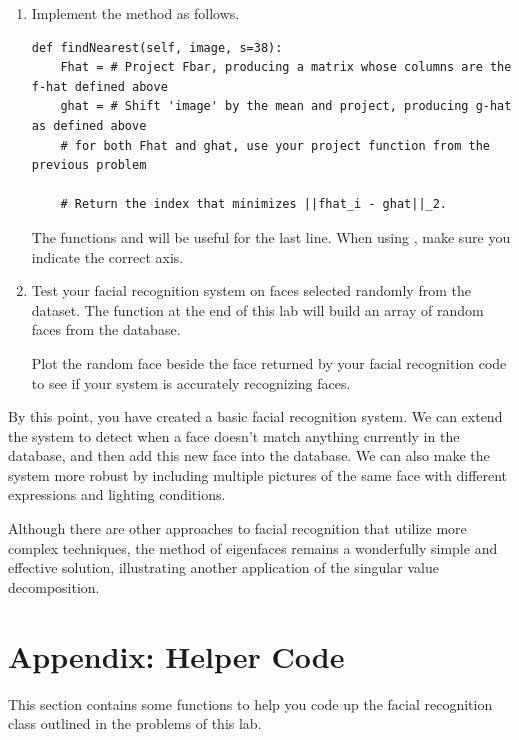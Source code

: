 \begin{problem}
\label{prob:nearest}
\leavevmode
\begin{enumerate}
\item
Implement the method  as follows.
\begin{lstlisting}
def findNearest(self, image, s=38):
    Fhat = # Project Fbar, producing a matrix whose columns are the f-hat defined above 
    ghat = # Shift 'image' by the mean and project, producing g-hat as defined above
    # for both Fhat and ghat, use your project function from the previous problem
    
    # Return the index that minimizes ||fhat_i - ghat||_2.
\end{lstlisting}
The functions  and  will be useful for the last line. When using , make sure you indicate the correct axis. 

\item Test your facial recognition system on faces selected randomly from the  dataset.
The function  at the end of this lab will build an array of  random faces from the  database.

Plot the random face beside the face returned by your facial recognition code to see if your system is accurately recognizing faces.

\end{enumerate}
\end{problem}


By this point, you have created a basic facial recognition system.
We can extend the system to detect when a face doesn't match anything currently in the database, and then add this new face into the database.
We can also make the system more robust by including multiple pictures of the same face with different expressions and lighting conditions.

Although there are other approaches to facial recognition that utilize more complex techniques, the method of eigenfaces remains
a wonderfully simple and effective solution, illustrating another application of the singular value decomposition.

\section*{Appendix: Helper Code}
This section contains some functions to help you code up the facial recognition class outlined in the problems of this lab.

